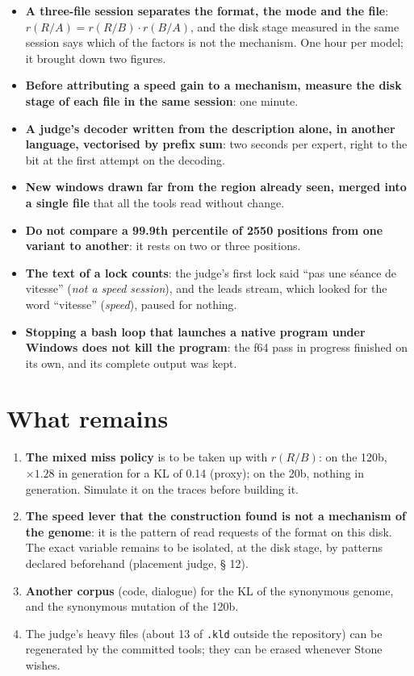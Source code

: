 \begin{itemize}
\item \textbf{A three-file session separates the format, the mode and the file}: $r(R/A) = r(R/B)\cdot r(B/A)$, and the disk stage measured in the same session says which of the factors is not the mechanism. One hour per model; it brought down two figures.
\item \textbf{Before attributing a speed gain to a mechanism, measure the disk stage of each file in the same session}: one minute.
\item \textbf{A judge's decoder written from the description alone, in another language, vectorised by prefix sum}: two seconds per expert, right to the bit at the first attempt on the decoding.
\item \textbf{New windows drawn far from the region already seen, merged into a single file} that all the tools read without change.
\item \textbf{Do not compare a 99.9th percentile of \num{2550} positions from one variant to another}: it rests on two or three positions.
\item \textbf{The text of a lock counts}: the judge's first lock said ``pas une séance de vitesse'' (\emph{not a speed session}), and the leads stream, which looked for the word ``vitesse'' (\emph{speed}), paused for nothing.
\item \textbf{Stopping a bash loop that launches a native program under Windows does not kill the program}: the f64 pass in progress finished on its own, and its complete output was kept.
\end{itemize}

\section{What remains}\label{t3jug:sec:reste}

\begin{enumerate}
\item \textbf{The mixed miss policy} is to be taken up with $r(R/B)$: on the 120b, $\times 1.28$ in generation for a KL of \num{0.14} (proxy); on the 20b, nothing in generation. Simulate it on the traces before building it.
\item \textbf{The speed lever that the construction found is not a mechanism of the genome}: it is the pattern of read requests of the format on this disk. The exact variable remains to be isolated, at the disk stage, by patterns declared beforehand (placement judge, § 12).
\item \textbf{Another corpus} (code, dialogue) for the KL of the synonymous genome, and the synonymous mutation of the 120b.
\item The judge's heavy files (about \SI{13}{\Go} of \texttt{.kld} outside the repository) can be regenerated by the committed tools; they can be erased whenever Stone wishes.
\end{enumerate}

